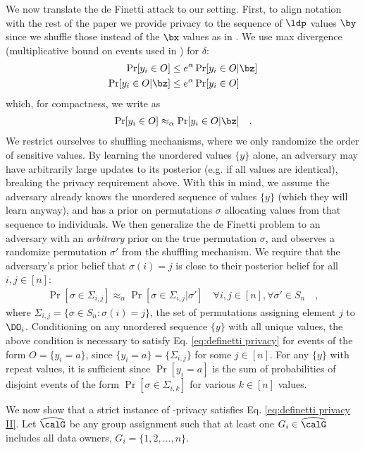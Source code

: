 We now translate the de Finetti attack to our setting. First, to align notation with the rest of the paper we provide privacy to the sequence of $\ldp$ values $\by$ since we shuffle those instead of the $\bx$ values as in \cite{definetti}. We use max divergence (multiplicative bound on events used in \DP) for $\delta$: 
\begin{align*}
    \Pr[y_i \in O] &\leq e^\alpha \Pr[y_i \in O | \bz] \\
    \Pr[y_i \in O | \bz] &\leq e^\alpha \Pr[y_i \in O]
\end{align*}
which, for compactness, we write as 
\begin{align}
    \Pr[y_i \in O] \approx_\alpha \Pr[y_i \in O | \bz] \quad. 
    \label{eq:definetti privacy}
\end{align}
We restrict ourselves to shuffling mechanisms, where we only randomize the order of sensitive values. By learning the unordered values $\{y\}$ alone, an adversary may have arbitrarily large updates to its posterior (e.g. if all values are identical), breaking the privacy requirement above. With this in mind, we assume the adversary already knows the unordered sequence of values $\{y\}$ (which they will learn anyway), and has a prior on permutations $\sigma$ allocating values from that sequence to individuals. We then generalize the de Finetti problem to an adversary with an \emph{arbitrary} prior on the true permutation $\sigma$, and observes a randomize permutation $\sigma'$ from the shuffling mechanism. We require that the adversary's prior belief that $\sigma(i) = j$ is close to their posterior belief for all $i,j \in [n]$: 
\begin{align}
    \Pr[\sigma \in \Sigma_{i,j} ] \approx_\alpha \Pr[\sigma \in \Sigma_{i,j} | \sigma'] \quad \forall i,j \in [n], \forall \sigma' \in S_n \quad ,
    \label{eq:definetti privacy II}
\end{align}
where $\Sigma_{i,j} = \{\sigma \in S_n : \sigma(i) = j\}$, the set of permutations assigning element $j$ to $\DO_i$. Conditioning on any unordered sequence $\{y\}$ with all unique values, the above condition is necessary to satisfy Eq. \eqref{eq:definetti privacy} for events of the form $O = \{y_i = a\}$, since $\{y_i = a\} = \{\Sigma_{i,j}\}$ for some $j \in [n]$. For any $\{y\}$ with repeat values, it is sufficient since $\Pr[y_i = a]$ is the sum of probabilities of disjoint events of the form $\Pr[\sigma \in \Sigma_{i,k}]$ for various $k \in [n]$ values. 

We now show that a strict instance of \name-privacy satisfies Eq. \eqref{eq:definetti privacy II}. Let $\widehat{\calG}$ be any group assignment such that at least one $G_i \in \widehat{\calG}$ includes all data owners, $G_i = \{1, 2, \dots, n\}$. 

